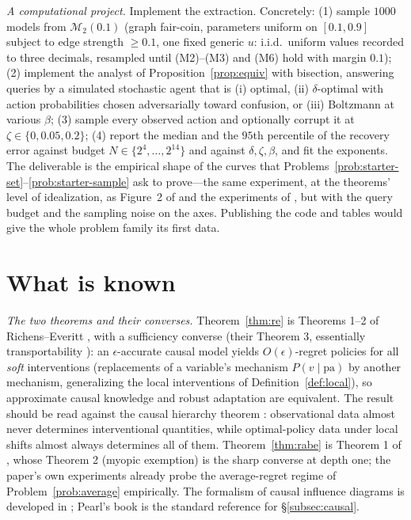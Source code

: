 \documentclass[11pt]{amsart}
\theoremstyle{plain}
\theoremstyle{definition}
\newcommand{\MM}{\mathcal{M}}
\begin{document}
\medskip
\noindent\emph{A computational project.} Implement the extraction. Concretely: (1) sample $1000$ models from $\MM_2(0.1)$ (graph fair-coin, parameters uniform on $[0.1,0.9]$ subject to edge strength $\ge0.1$, one fixed generic $u$: i.i.d.\ uniform values recorded to three decimals, resampled until (M2)--(M3) and (M6) hold with margin $0.1$); (2) implement the analyst of Proposition~\ref{prop:equiv} with bisection, answering queries by a simulated stochastic agent that is (i) optimal, (ii) $\delta$-optimal with action probabilities chosen adversarially toward confusion, or (iii) Boltzmann at various $\beta$; (3) sample every observed action and optionally corrupt it at $\zeta\in\{0,0.05,0.2\}$; (4) report the median and the $95$th percentile of the recovery error against budget $N\in\{2^4,\dots,2^{14}\}$ and against $\delta,\zeta,\beta$, and fit the exponents. The deliverable is the empirical shape of the curves that Problems~\ref{prob:starter-set}--\ref{prob:starter-sample} ask to prove---the same experiment, at the theorems' level of idealization, as Figure~2 of \cite{richens2024} and the experiments of \cite{richens2025}, but with the query budget and the sampling noise on the axes. Publishing the code and tables would give the whole problem family its first data.

\section{What is known}\label{sec:known}

\emph{The two theorems and their converses.} Theorem~\ref{thm:re} is Theorems 1--2 of Richens--Everitt \cite{richens2024}, with a sufficiency converse (their Theorem 3, essentially transportability \cite{bareinboim2022}): an $\epsilon$-accurate causal model yields $O(\epsilon)$-regret policies for all \emph{soft} interventions (replacements of a variable's mechanism $P(v\mid\mathrm{pa})$ by another mechanism, generalizing the local interventions of Definition~\ref{def:local}), so approximate causal knowledge and robust adaptation are equivalent. The result should be read against the causal hierarchy theorem \cite{bareinboim2022}: observational data almost never determines interventional quantities, while optimal-policy data under local shifts almost always determines all of them. Theorem~\ref{thm:rabe} is Theorem 1 of \cite{richens2025}, whose Theorem 2 (myopic exemption) is the sharp converse at depth one; the paper's own experiments already probe the average-regret regime of Problem~\ref{prob:average} empirically. The formalism of causal influence diagrams is developed in \cite{everitt2021}; Pearl's book \cite{pearl2009} is the standard reference for \S\ref{subsec:causal}.
\end{document}
